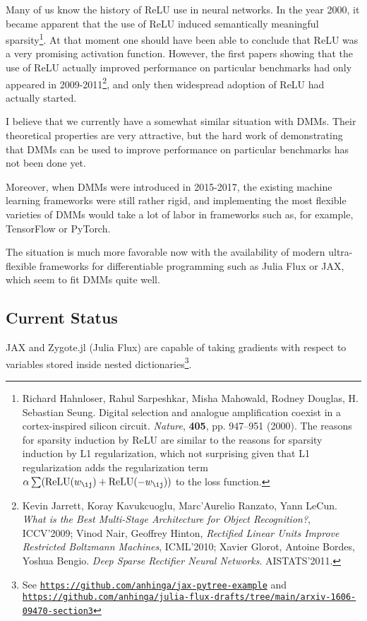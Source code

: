 \documentclass{article}
\begin{document}
Many of us know the history of ReLU use in neural networks. In the year 2000, it became apparent that
the use of ReLU induced semantically meaningful sparsity\footnote{Richard Hahnloser, Rahul Sarpeshkar, 
Misha Mahowald, Rodney Douglas, H. Sebastian Seung. 
Digital selection and analogue amplification coexist in a cortex-inspired silicon circuit.
{\em Nature}, {\bf 405}, pp. 947–951 (2000). The reasons for sparsity induction by ReLU are similar
to the reasons for sparsity induction by L1 regularization, which not surprising given that 
L1 regularization adds the regularization term $\alpha\sum(\mbox{ReLU}(w_{\ij})+\mbox{ReLU}(-w_{\ij}))$ to the loss function.}. At that moment
one should have been able to conclude that ReLU was a very promising activation function.
However, the first papers showing that the use of ReLU actually improved performance on particular
benchmarks had only appeared in 2009-2011\footnote{Kevin Jarrett, Koray Kavukcuoglu, Marc’Aurelio Ranzato, Yann LeCun. {\em What is the Best Multi-Stage Architecture for Object Recognition?}, ICCV'2009; Vinod Nair, Geoffrey Hinton,
{\em Rectified Linear Units Improve Restricted Boltzmann Machines}, ICML'2010; Xavier Glorot, Antoine Bordes, Yoshua Bengio. 
{\em Deep Sparse Rectifier Neural Networks}. AISTATS'2011.}, and only then widespread adoption of ReLU
had actually started.

I believe that we currently have a somewhat similar situation with DMMs. Their theoretical properties are very attractive,
but the hard work of demonstrating that DMMs can be used to improve performance on particular benchmarks
has not been done yet.

Moreover, when DMMs were introduced in 2015-2017, the existing machine learning frameworks
were still rather rigid, and implementing the most flexible varieties of DMMs would take a lot of labor
in frameworks such as, for example, TensorFlow or PyTorch. 

The situation is much more favorable now with
the availability of modern ultra-flexible frameworks for differentiable programming such as Julia Flux or JAX,
which seem to fit DMMs quite well.

\subsection{Current Status}

JAX and Zygote.jl (Julia Flux) are capable of taking gradients with respect to variables stored inside 
nested dictionaries\footnote{See \href{https://github.com/anhinga/jax-pytree-example}{\tt https://github.com/anhinga/jax-pytree-example}
and\\ \href{https://github.com/anhinga/julia-flux-drafts/tree/main/arxiv-1606-09470-section3}
{\tt https://github.com/anhinga/julia-flux-drafts/tree/main/arxiv-1606-09470-section3}}.
\end{document}
